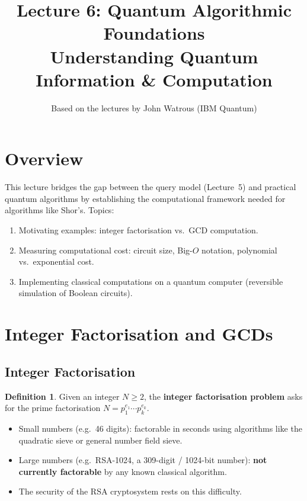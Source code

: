 \documentclass[11pt]{article}
\title{\textbf{Lecture 6: Quantum Algorithmic Foundations} \\ \large Understanding Quantum Information \& Computation}
\author{Based on the lectures by John Watrous (IBM Quantum)}
\date{}
\theoremstyle{definition}
\newtheorem{definition}{Definition}[section]
\begin{document}
\maketitle
\tableofcontents
\newpage

\section{Overview}

This lecture bridges the gap between the query model (Lecture~5) and practical quantum algorithms by establishing the computational framework needed for algorithms like Shor's.  Topics:

\begin{enumerate}
    \item Motivating examples: integer factorisation vs.\ GCD computation.
    \item Measuring computational cost: circuit size, Big-$O$ notation, polynomial vs.\ exponential cost.
    \item Implementing classical computations on a quantum computer (reversible simulation of Boolean circuits).
\end{enumerate}

\section{Integer Factorisation and GCDs}

\subsection{Integer Factorisation}

\begin{definition}
Given an integer $N\ge 2$, the \textbf{integer factorisation problem} asks for the prime factorisation $N = p_1^{e_1}\cdots p_k^{e_k}$.
\end{definition}

\begin{itemize}
    \item Small numbers (e.g.\ 46 digits): factorable in seconds using algorithms like the quadratic sieve or general number field sieve.
    \item Large numbers (e.g.\ RSA-1024, a 309-digit / 1024-bit number): \textbf{not currently factorable} by any known classical algorithm.
    \item The security of the RSA cryptosystem rests on this difficulty.
\end{itemize}
\end{document}
